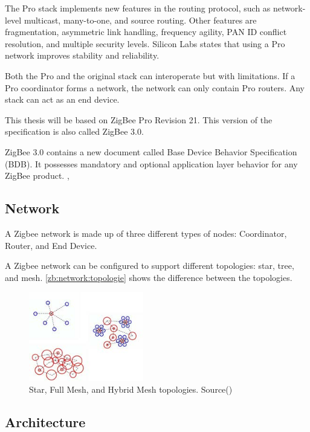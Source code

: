 The Pro stack implements new features in the routing protocol, such as network-level multicast, many-to-one, and source routing.
Other features are fragmentation, asymmetric link handling, frequency agility, PAN ID conflict resolution, and multiple security levels.
Silicon Labs states that using a Pro network improves stability and reliability.

Both the Pro and the original stack can interoperate but with limitations.
If a Pro coordinator forms a network, the network can only contain Pro routers.
Any stack can act as an end device. \cite{zigbee:silabs:ug103:2}

This thesis will be based on ZigBee Pro Revision 21. This version of the specification is also called ZigBee 3.0.

ZigBee 3.0 contains a new document called Base Device Behavior Specification (BDB).
It possesses mandatory and optional application layer behavior for any ZigBee product. \cite{ti:new:19}, \cite{Morgner:2017}

\subsection{Network}
\label{zb:net:intro}

A Zigbee network is made up of three different types of nodes: Coordinator, Router, and End Device. \cite{Whitehurst:14}

A Zigbee network can be configured to support different topologies: star, tree, and mesh. \autoref{zb:network:topologie} shows the difference between the topologies.

\begin{figure}[!ht]
    \centering
    \includegraphics[width=50mm, keepaspectratio]{figures/zigbee-topology-ug103-02-fundamentals-zigbee.jpg}
    \caption{Star, Full Mesh, and Hybrid Mesh topologies. Source(\cite{zigbee:silabs:ug103:2})}
    \label{zb:network:topologie}
\end{figure}

\subsection{Architecture}

